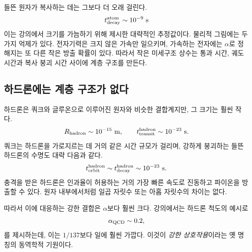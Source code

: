 들뜬 원자가 복사하는 데는 그보다 더 오래 걸린다.
\begin{equation}
t_{\rm decay}^{\rm atom}\sim10^{-9}\ {\rm s}
\end{equation} 이는 강의에서 크기를 가늠하기 위해 제시한 대략적인 추정값이다. 물리적 그림에는 두 가지 억제가 있다. 전자기력은 크지 않은 가속만 일으키며, 가속하는 전자에는 \(\alpha\)로 정해지는 또 다른 작은 방출 확률이 있다. 따라서 작은 미세구조 상수는 통과 시간, 궤도 시간과 복사 붕괴 시간 사이에 계층 구조를 만든다.

\subsection{하드론에는 계층 구조가 없다}

하드론은 쿼크와 글루온으로 이루어진 원자와 비슷한 결합계지만, 그 크기는 훨씬 작다.
\begin{equation}
R_{\rm hadron}\sim10^{-15}\ {\rm m},
\qquad
t_{\rm transit}^{\rm hadron}\sim10^{-23}\ {\rm s}.
\end{equation} 쿼크는 하드론을 가로지르는 데 거의 같은 시간 규모가 걸리며, 강하게 붕괴하는 들뜬 하드론의 수명도 대략 다음과 같다.
\begin{equation}
t_{\rm orbit}^{\rm hadron}
\sim t_{\rm decay}^{\rm hadron}
\sim10^{-23}\ {\rm s}.
\end{equation} 충격을 받은 하드론은 인과율이 허용하는 거의 가장 빠른 속도로 진동하고 파이온을 방출할 수 있다. 원자 내부에서처럼 일곱 자릿수 또는 아홉 자릿수의 차이는 없다.

\begin{classroomqa}\end{classroomqa}

따라서 이에 대응하는 강한 결합은 \(\alpha\)보다 훨씬 크다. 강의에서는 하드론 척도의 예시로
\begin{equation}
\alpha_{\rm QCD}\sim0.2,
\end{equation}를 제시하는데, 이는 \(1/137\)보다 일에 훨씬 가깝다. 이것이 \emph{강한 상호작용}이라는 옛 명칭의 동역학적 기원이다.

